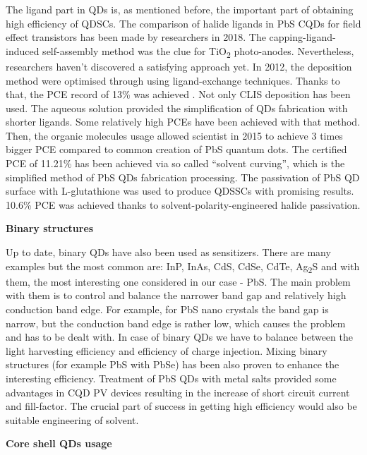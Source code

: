 \begin{enumerate}
The ligand part in QDs is, as mentioned before, the important part of obtaining high efficiency of QDSCs. \cite{Shang2016} The comparison of halide ligands in PbS CQDs for field effect transistors has been made by researchers in 2018.\cite{Balazs2018} The capping-ligand-induced self-assembly method was the clue for TiO\textsubscript{2} photo-anodes.\cite{HuashangRao2018} Nevertheless, researchers haven't discovered a satisfying approach yet. In 2012, the deposition method were optimised through using ligand-exchange techniques.\cite{Cheng2012} Thanks to that, the PCE record of 13\% was achieved \cite{W.Feng2018} . Not only CLIS deposition has been used. The aqueous solution provided the simplification of QDs fabrication with shorter ligands. Some relatively high PCEs have been achieved with that method. Then, the organic  molecules usage allowed scientist in 2015 to achieve 3 times bigger PCE compared to common creation of PbS quantum dots.\cite{Infante2015} The certified PCE of 11.21\% has been achieved via so called ``solvent curving'', which is the simplified method of PbS QDs fabrication processing. The passivation of PbS QD surface with
L-glutathione was used to produce QDSSCs with promising results.\cite{Cordes2016} 10.6\% PCE was achieved thanks to solvent-polarity-engineered halide passivation. \cite{OleksandrVoznyy2016} 

\textbf{Binary structures}

Up to date, binary QDs have also been used as sensitizers. There are
many examples but the most common are: InP, InAs, CdS, CdSe, CdTe,
Ag\textsubscript{2}S and with them, the most interesting one considered
in our case - PbS.\cite{P.Zhao2015} \cite{Y.Yu2008} The main problem with
them is to control and balance the narrower band gap and relatively high
conduction band edge. For example, for PbS nano crystals the band gap is
narrow, but the conduction band edge is rather low, which causes the
problem and has to be dealt with. In case of binary QDs we have to
balance between the light harvesting efficiency and efficiency of charge
injection. Mixing binary structures (for example PbS with PbSe) has been
also proven to enhance the interesting efficiency.\cite{ShujuanHuangb22019} \cite{Fan} Treatment of PbS QDs with metal salts provided some advantages in CQD PV devices resulting in the increase of short circuit current and fill-factor. \cite{Maurano2016} 
The crucial part of success in getting high efficiency would also be
suitable engineering of solvent.\cite{YuehuaYang2017}

\textbf{Core shell QDs usage}


\end{enumerate}

